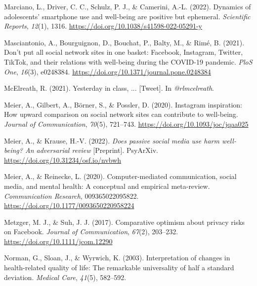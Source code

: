 \documentclass[
  man,mask]{apa7}
\newlength{\cslhangindent}
\newlength{\cslentryspacingunit} %
\newenvironment{CSLReferences}[2] %
 {%
  \setlength{\parindent}{0pt}
  \ifodd #1
  \let\oldpar\par
  \def\par{\hangindent=\cslhangindent\oldpar}
  \fi
  \setlength{\parskip}{#2\cslentryspacingunit}
 }%
 {}
\begin{document}
\begin{CSLReferences}{1}{0}
\leavevmode{}%
Marciano, L., Driver, C. C., Schulz, P. J., \& Camerini, A.-L. (2022). Dynamics of adolescents' smartphone use and well-being are positive but ephemeral. \emph{Scientific Reports}, \emph{12}(1), 1316. \url{https://doi.org/10.1038/s41598-022-05291-y}

\leavevmode{}%
Masciantonio, A., Bourguignon, D., Bouchat, P., Balty, M., \& Rimé, B. (2021). Don't put all social network sites in one basket: {Facebook}, {Instagram}, {Twitter}, {TikTok}, and their relations with well-being during the {COVID-19} pandemic. \emph{PloS One}, \emph{16}(3), e0248384. \url{https://doi.org/10.1371/journal.pone.0248384}

\leavevmode{}%
McElreath, R. (2021). Yesterday in class, ... {[}Tweet{]}. In \emph{@rlmcelreath}.

\leavevmode{}%
Meier, A., Gilbert, A., Börner, S., \& Possler, D. (2020). Instagram inspiration: {How} upward comparison on social network sites can contribute to well-being. \emph{Journal of Communication}, \emph{70}(5), 721--743. \url{https://doi.org/10.1093/joc/jqaa025}

\leavevmode{}%
Meier, A., \& Krause, H.-V. (2022). \emph{Does passive social media use harm well-being? {An} adversarial review} {[}Preprint{]}. {PsyArXiv}. \url{https://doi.org/10.31234/osf.io/nvbwh}

\leavevmode{}%
Meier, A., \& Reinecke, L. (2020). Computer-mediated communication, social media, and mental health: {A} conceptual and empirical meta-review. \emph{Communication Research}, 009365022095822. \url{https://doi.org/10.1177/0093650220958224}

\leavevmode{}%
Metzger, M. J., \& Suh, J. J. (2017). Comparative optimism about privacy risks on {Facebook}. \emph{Journal of Communication}, \emph{67}(2), 203--232. \url{https://doi.org/10.1111/jcom.12290}

\leavevmode{}%
Norman, G., Sloan, J., \& Wyrwich, K. (2003). Interpretation of changes in health-related quality of life: {The} remarkable universality of half a standard deviation. \emph{Medical Care}, \emph{41}(5), 582--592.


\end{CSLReferences}
\end{document}
